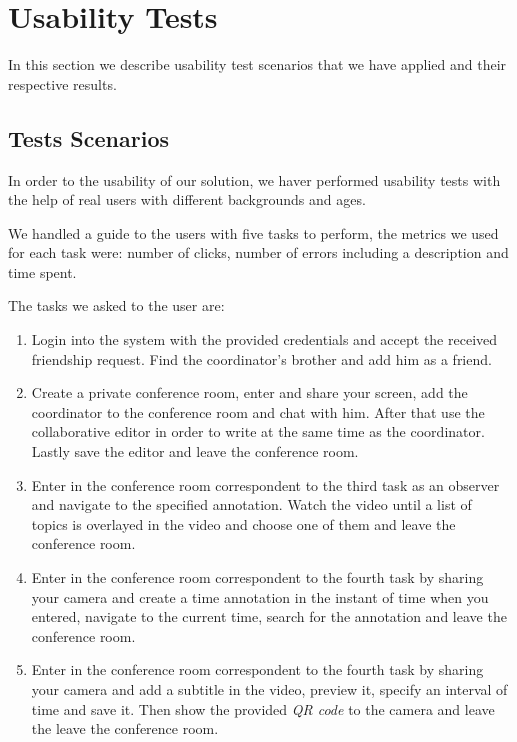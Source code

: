\section {Usability Tests}
     In this section we describe usability test scenarios that we have applied and their respective results.


    \subsection{Tests Scenarios}

      In order to the usability of our solution, we haver performed usability tests with the help of real users with different backgrounds and ages.

      We handled a guide to the users with five tasks to perform, the metrics we used for each task were: number of clicks, number of errors including a description and time spent. 

      The tasks we asked to the user are:

      \begin{enumerate}
      \item Login into the system with the provided credentials and accept the received friendship request. Find the coordinator's brother and add him as a friend.

      \item Create a private conference room, enter and share your screen, add the coordinator to the conference room and chat with him. After that use the collaborative editor in order to write at the same time as the coordinator. Lastly save the editor and leave the conference room.

      \item Enter in the conference room correspondent to the third task as an observer and navigate to the specified annotation. Watch the video until a list of topics is overlayed in the video and choose one of them and leave the conference room.

      \item Enter in the conference room correspondent to the fourth task by sharing your camera and create a time annotation in the instant of time when you entered, navigate to the current time, search for the annotation and leave the conference room.

      \item Enter in the conference room correspondent to the fourth task by sharing your camera and add a subtitle in the video, preview it, specify an interval of time and save it. Then show the provided \emph{QR code} to the camera and leave the leave the conference room.
      \end{enumerate}

